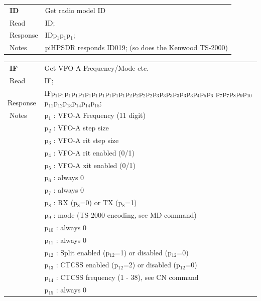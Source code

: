 \documentclass[12pt]{book}
\begin{document}
\begin{center}
\begin{tabular}{|p{2cm}|p{11cm}|}
\toprule
$\phantom{\Big|}$\textbf{\large ID} & Get radio model ID \\\cline{1-2}
$\phantom{\Big|}${\large Read} & {ID;} \\\hline
$\phantom{\Big|}${\large Response} & {IDp$_1$p$_1$p$_1$;} \\\hline
$\phantom{\Big|}${\large Notes} & \multicolumn{1}{|p{11cm}|}{piHPSDR responds ID019; (so does the Kenwood TS-2000)} \\
\bottomrule
\end{tabular}
\end{center}

\begin{center}
\begin{tabular}{|p{2cm}|p{11cm}|}
\toprule
$\phantom{\Big|}$\textbf{\large IF} & Get VFO-A Frequency/Mode etc. \\\cline{1-2}
$\phantom{\Big|}${\large Read} & {IF;} \\\hline
$\phantom{\Big|}${\large Response} & {IFp$_1$p$_1$p$_1$p$_1$p$_1$p$_1$p$_1$p$_1$p$_1$p$_1$p$_1$p$_2$p$_2$p$_2$p$_2$p$_3$p$_3$p$_3$p$_3$p$_3$p$_3$p$_4$p$_5$p$_6$
p$_7$p$_7$p$_8$p$_9$p$_{10}$p$_{11}$p$_{12}$p$_{13}$p$_{14}$p$_{14}$p$_{15}$;} \\\hline
$\phantom{\Big|}${\large Notes} & \multicolumn{1}{|p{11cm}|}{p$_1$ : VFO-A Frequency (11 digit)} \\
 & \multicolumn{1}{|p{11cm}|}{p$_2$ : VFO-A step size} \\
 & \multicolumn{1}{|p{11cm}|}{p$_3$ : VFO-A rit step size} \\
 & \multicolumn{1}{|p{11cm}|}{p$_4$ : VFO-A rit enabled (0/1)} \\
 & \multicolumn{1}{|p{11cm}|}{p$_5$ : VFO-A xit enabled (0/1)} \\
 & \multicolumn{1}{|p{11cm}|}{p$_6$ : always 0} \\
 & \multicolumn{1}{|p{11cm}|}{p$_7$ : always 0} \\
 & \multicolumn{1}{|p{11cm}|}{p$_8$ : RX (p$_8$=0) or TX (p$_8$=1)} \\
 & \multicolumn{1}{|p{11cm}|}{p$_9$ : mode (TS-2000 encoding, see MD command)} \\
 & \multicolumn{1}{|p{11cm}|}{p$_{10}$ : always 0} \\
 & \multicolumn{1}{|p{11cm}|}{p$_{11}$ : always 0} \\
 & \multicolumn{1}{|p{11cm}|}{p$_{12}$ : Split enabled (p$_{12}$=1) or disabled (p$_{12}$=0)} \\
 & \multicolumn{1}{|p{11cm}|}{p$_{13}$ : CTCSS enabled (p$_{12}$=2) or disabled (p$_{12}$=0)} \\
 & \multicolumn{1}{|p{11cm}|}{p$_{14}$ : CTCSS frequency (1 - 38), see CN command} \\
 & \multicolumn{1}{|p{11cm}|}{p$_{15}$ : always 0} \\
\bottomrule
\end{tabular}
\end{center}
\end{document}
